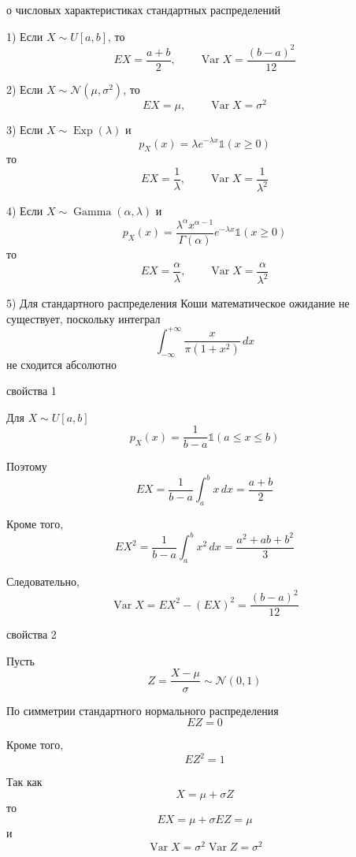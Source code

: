 \documentclass[12pt,a4paper]{article}
\begin{document}
\begin{theorem}{о числовых характеристиках стандартных распределений}

1) Если $X\sim U[a,b]$, то
\[
EX=\frac{a+b}{2},
\qquad
\operatorname{Var}X=\frac{(b-a)^2}{12}
\]

\medskip

2) Если $X\sim\mathcal{N}(\mu,\sigma^2)$, то
\[
EX=\mu,
\qquad
\operatorname{Var}X=\sigma^2
\]

\medskip

3) Если $X\sim\operatorname{Exp}(\lambda)$ и
\[
p_X(x)=\lambda e^{-\lambda x}\mathds{1}(x\geq0)
\]
то
\[
EX=\frac{1}{\lambda},
\qquad
\operatorname{Var}X=\frac{1}{\lambda^2}
\]

\medskip

4) Если $X\sim\operatorname{Gamma}(\alpha,\lambda)$ и
\[
p_X(x)
=
\frac{\lambda^\alpha x^{\alpha-1}}{\Gamma(\alpha)}
e^{-\lambda x}\mathds{1}(x\geq0)
\]
то
\[
EX=\frac{\alpha}{\lambda},
\qquad
\operatorname{Var}X=\frac{\alpha}{\lambda^2}
\]

\medskip

5) Для стандартного распределения Коши математическое ожидание не существует, поскольку интеграл
\[
\int_{-\infty}^{+\infty}
\frac{x}{\pi(1+x^2)}\,dx
\]
не сходится абсолютно

\end{theorem}

\begin{proofbox}{свойства 1}

Для $X\sim U[a,b]$
\[
p_X(x)
=
\frac{1}{b-a}\mathds{1}(a\leq x\leq b)
\]

Поэтому
\[
EX
=
\frac{1}{b-a}\int_a^b x\,dx
=
\frac{a+b}{2}
\]

Кроме того,
\[
EX^2
=
\frac{1}{b-a}\int_a^b x^2\,dx
=
\frac{a^2+ab+b^2}{3}
\]

Следовательно,
\[
\operatorname{Var}X
=
EX^2-(EX)^2
=
\frac{(b-a)^2}{12}
\]

\end{proofbox}

\begin{proofbox}{свойства 2}

Пусть
\[
Z=\frac{X-\mu}{\sigma}
\sim\mathcal{N}(0,1)
\]

По симметрии стандартного нормального распределения
\[
EZ=0
\]

Кроме того,
\[
EZ^2=1
\]

Так как
\[
X=\mu+\sigma Z
\]
то
\[
EX=\mu+\sigma EZ=\mu
\]
и
\[
\operatorname{Var}X
=
\sigma^2\operatorname{Var}Z
=
\sigma^2
\]

\end{proofbox}
\end{document}
